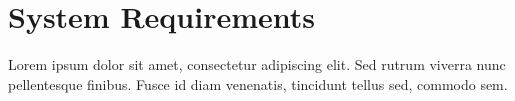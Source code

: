 \section{System Requirements}
Lorem ipsum dolor sit amet, consectetur adipiscing elit. Sed rutrum viverra nunc pellentesque finibus. Fusce id diam venenatis, tincidunt tellus sed, commodo sem.
